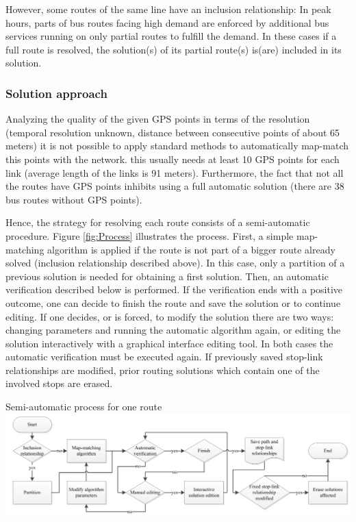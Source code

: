 However, some routes of the same line have an inclusion relationship: In peak hours, parts of bus routes facing high demand are enforced by additional bus services running on only partial routes to fulfill the demand. In these cases if a full route is resolved, the solution(s) of its partial route(s) is(are) included in its solution.

\subsubsection{Solution approach}

Analyzing the quality of the given GPS points in terms of the resolution (temporal resolution unknown, distance between consecutive points of about 65 meters) it is not possible to apply standard methods to automatically map-match this points with the network. this usually needs at least 10 GPS points for each link (average length of the links is 91 meters). Furthermore, the fact that not all the routes have GPS points inhibits using a full automatic solution (there are 38 bus routes without GPS points).

Hence, the strategy for resolving each route consists of a semi-automatic procedure. Figure \ref{fig:Process} illustrates the process. First, a simple map-matching algorithm is applied if the route is not part of a bigger route already solved (inclusion relationship described above). In this case, only a partition of a previous solution is needed for obtaining a first solution. Then, an automatic verification described below is performed. If the verification ends with a positive outcome, one can decide to finish the route and save the solution or to continue editing. If one decides, or is forced, to modify the solution there are two ways: changing parameters and running the automatic algorithm again, or editing the solution interactively with a graphical interface editing tool. In both cases the automatic verification must be executed again. If previously saved stop-link relationships are modified, prior routing solutions which contain one of the involved stops are erased.

\createfigure
{}
{Semi-automatic process for one route}
{\label{fig:Process}}
{\includegraphics[width=1.0\textwidth]{extending/figures/semiAuto/Process.png}}
{}

